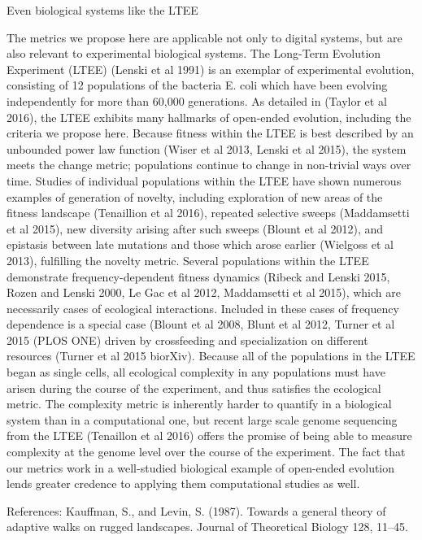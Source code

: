 \documentclass[letterpaper]{article}
\begin{document}
Even biological systems like the LTEE

The metrics we propose here are applicable not only to digital systems, but are also relevant to experimental biological systems.  The Long-Term Evolution Experiment (LTEE) (Lenski et al 1991) is an exemplar of experimental evolution, consisting of 12 populations of the bacteria E. coli which have been evolving independently for more than 60,000 generations.  As detailed in (Taylor et al 2016), the LTEE exhibits many hallmarks of open-ended evolution, including the criteria we propose here.  Because fitness within the LTEE is best described by an unbounded power law function (Wiser et al 2013, Lenski et al 2015), the system meets the change metric; populations continue to change in non-trivial ways over time.  Studies of individual populations within the LTEE have shown numerous examples of generation of novelty, including exploration of new areas of the fitness landscape (Tenaillion et al 2016), repeated selective sweeps (Maddamsetti et al 2015), new diversity arising after such sweeps (Blount et al 2012), and epistasis between late mutations and those which arose earlier (Wielgoss et al 2013), fulfilling the novelty metric.  Several populations within the LTEE demonstrate frequency-dependent fitness dynamics (Ribeck and Lenski 2015, Rozen and Lenski 2000, Le Gac et al 2012, Maddamsetti et al 2015), which are necessarily cases of ecological interactions.  Included in these cases of frequency dependence is a special case (Blount et al 2008, Blunt et al 2012, Turner et al 2015 (PLOS ONE) driven by crossfeeding and specialization on different resources (Turner et al 2015 biorXiv).  Because all of the populations in the LTEE began as single cells, all ecological complexity in any populations must have arisen during the course of the experiment, and thus satisfies the  ecological metric.  The complexity metric is inherently harder to quantify in a biological system than in a computational one, but recent large scale genome sequencing from the LTEE (Tenaillon et al 2016) offers the promise of being able to measure complexity at the genome level over the course of the experiment.  The fact that our metrics work in a well-studied biological example of open-ended evolution lends greater credence to applying them computational studies as well.

References:
Kauffman, S., and Levin, S. (1987). Towards a general theory of adaptive walks on rugged landscapes. Journal of Theoretical Biology 128, 11–45.




\end{document}
